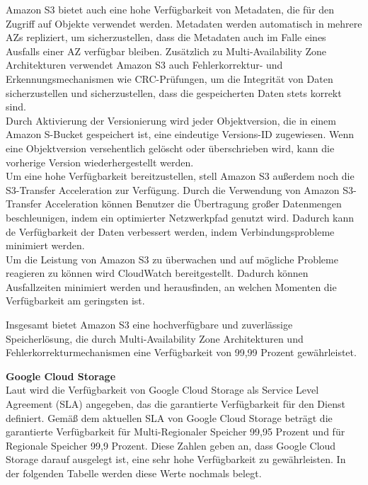 Amazon S3 bietet auch eine hohe Verfügbarkeit von Metadaten, die für den Zugriff auf Objekte verwendet werden. Metadaten werden automatisch in mehrere AZs repliziert, um sicherzustellen, dass die Metadaten auch im Falle eines Ausfalls einer AZ verfügbar bleiben. Zusätzlich zu Multi-Availability Zone Architekturen verwendet Amazon S3 auch Fehlerkorrektur- und Erkennungsmechanismen wie CRC-Prüfungen, um die Integrität von Daten sicherzustellen und sicherzustellen, dass die gespeicherten Daten stets korrekt sind.\\

Durch Aktivierung der Versionierung wird jeder Objektversion, die in einem Amazon S-Bucket gespeichert ist, eine eindeutige Versions-ID zugewiesen. Wenn eine Objektversion versehentlich gelöscht oder überschrieben wird, kann die vorherige Version wiederhergestellt werden.\\

Um eine hohe Verfügbarkeit bereitzustellen, stell Amazon S3 außerdem noch die S3-Transfer Acceleration zur Verfügung. Durch die Verwendung von Amazon S3-Transfer Acceleration können Benutzer die Übertragung großer Datenmengen beschleunigen, indem ein optimierter Netzwerkpfad genutzt wird. Dadurch kann de Verfügbarkeit der Daten verbessert werden, indem Verbindungsprobleme minimiert werden.\\

Um die Leistung von Amazon S3 zu überwachen und auf mögliche Probleme reagieren zu können wird CloudWatch bereitgestellt. Dadurch können Ausfallzeiten minimiert werden und herausfinden, an welchen Momenten die Verfügbarkeit am geringsten ist.

Insgesamt bietet Amazon S3 eine hochverfügbare und zuverlässige Speicherlösung, die durch Multi-Availability Zone Architekturen und Fehlerkorrekturmechanismen eine Verfügbarkeit von 99,99 Prozent gewährleistet.

\newpage

\textbf{Google Cloud Storage}\\

Laut \cite{gcp-sla} wird die Verfügbarkeit von Google Cloud Storage als Service Level Agreement (SLA) angegeben, das die garantierte Verfügbarkeit für den Dienst definiert. Gemäß dem aktuellen SLA von Google Cloud Storage beträgt die garantierte Verfügbarkeit für Multi-Regionaler Speicher 99,95 Prozent und für Regionale Speicher 99,9 Prozent. Diese Zahlen geben an, dass Google Cloud Storage darauf ausgelegt ist, eine sehr hohe Verfügbarkeit zu gewährleisten. In der folgenden Tabelle werden diese Werte nochmals belegt.

